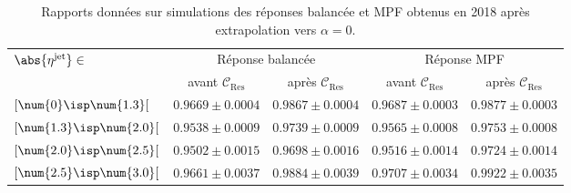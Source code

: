 \begin{table}[p]
\centering
\begin{tabular}{lcccc}
\toprule
\multirow{2}{*}{$\abs{\eta^\text{jet}}\in$} & \multicolumn{2}{c}{Réponse balancée} & \multicolumn{2}{c}{Réponse MPF} \\
\cmidrule(lr){2-3}\cmidrule(lr){4-5}
 & avant $\mathcal{C}_\text{Res}$ & après $\mathcal{C}_\text{Res}$ & avant $\mathcal{C}_\text{Res}$ & après $\mathcal{C}_\text{Res}$ \\
\midrule
$[\num{0}\isp \num{1.3}[$ & $\num{0.9669}\pm\num{0.0004}$ & $\num{0.9867}\pm\num{0.0004}$ & $\num{0.9687}\pm\num{0.0003}$ & $\num{0.9877}\pm\num{0.0003}$ \\
$[\num{1.3}\isp \num{2.0}[$ & $\num{0.9538}\pm\num{0.0009}$ & $\num{0.9739}\pm\num{0.0009}$ & $\num{0.9565}\pm\num{0.0008}$ & $\num{0.9753}\pm\num{0.0008}$ \\
$[\num{2.0}\isp \num{2.5}[$ & $\num{0.9502}\pm\num{0.0015}$ & $\num{0.9698}\pm\num{0.0016}$ & $\num{0.9516}\pm\num{0.0014}$ & $\num{0.9724}\pm\num{0.0014}$ \\
$[\num{2.5}\isp \num{3.0}[$ & $\num{0.9661}\pm\num{0.0037}$ & $\num{0.9884}\pm\num{0.0039}$ & $\num{0.9707}\pm\num{0.0034}$ & $\num{0.9922}\pm\num{0.0035}$ \\
\bottomrule
\end{tabular}
\caption[Rapports des réponses balancée et MPF obtenus en 2018 après extrapolation vers $\alpha=0$.]{Rapports données sur simulations des réponses balancée et MPF obtenus en 2018 après extrapolation vers $\alpha=0$.}
\label{tab-responses_recap_table_L2L3Res_cross_check_2018ABCD}
\end{table}